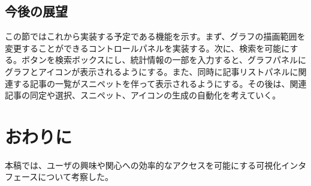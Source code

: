 \documentclass{matsushita-zemi}
\begin{document}
\subsection{今後の展望}
この節ではこれから実装する予定である機能を示す。まず、グラフの描画範囲を変更することができるコントロールパネルを実装する。次に、検索を可能にする。ボタンを検索ボックスにし、統計情報の一部を入力すると、グラフパネルにグラフとアイコンが表示されるようにする。また、同時に記事リストパネルに関連する記事の一覧がスニペットを伴って表示されるようにする。その後は、関連記事の同定や選択、スニペット、アイコンの生成の自動化を考えていく。


\section{おわりに}
本稿では、ユーザの興味や関心への効率的なアクセスを可能にする可視化インタフェースについて考察した。



\end{document}
